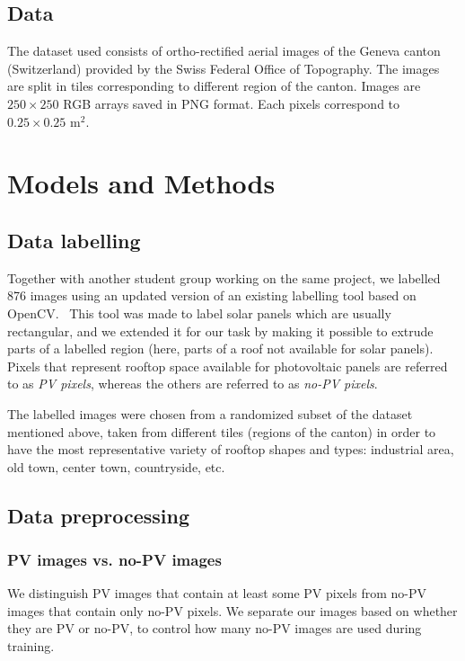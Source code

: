 \documentclass[10pt,conference]{IEEEtran}
\begin{document}
\subsection{Data}
The dataset used consists of ortho-rectified aerial images of the Geneva canton (Switzerland) provided by the Swiss Federal Office of Topography.
The images are split in tiles corresponding to different region of the canton.
Images are $250 \times 250$ RGB arrays saved in PNG format.
Each pixels correspond to $0.25 \times 0.25 \text{ m}^2$.


\section{Models and Methods}

\subsection{Data labelling}
Together with another student group working on the same project, we labelled 876 images using an updated version of an existing labelling tool based on OpenCV.~\cite{Castello_2019}
This tool was made to label solar panels which are usually rectangular, and we extended it for our task by making it possible to extrude parts of a labelled region (here, parts of a roof not available for solar panels).
Pixels that represent rooftop space available for photovoltaic panels are referred to as \emph{PV pixels}, whereas the others are referred to as \emph{no-PV pixels}.

The labelled images were chosen from a randomized subset of the dataset mentioned above, taken from different tiles (regions of the canton) in order to have the most representative variety of rooftop shapes and types: industrial area, old town, center town, countryside, etc. 

\subsection{Data preprocessing}

\subsubsection{PV images vs. no-PV images}
We distinguish PV images that contain at least some PV pixels from no-PV images that contain only no-PV pixels.
We separate our images based on whether they are PV or no-PV, to control how many no-PV images are used during training.
\end{document}
